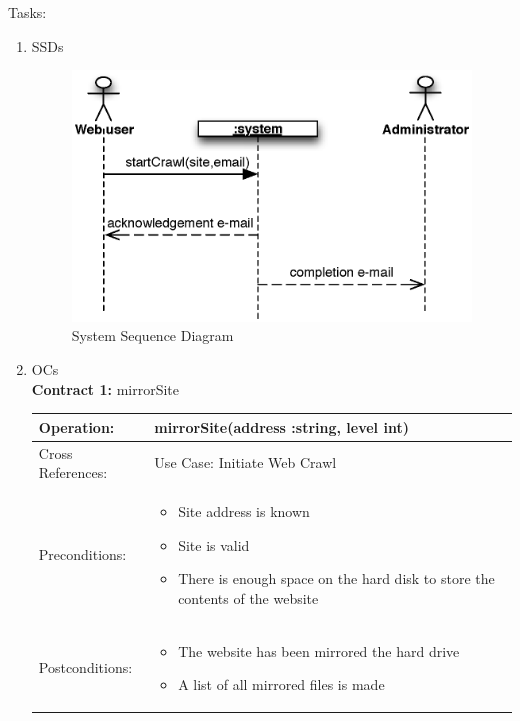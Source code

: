 \documentclass{article}
\begin{document}
\fancyhf{}
\rhead{\today}

{\large Tasks:}
\begin{enumerate}

\item SSDs 
\begin{figure}[H]
	\includegraphics[width=.8\textwidth]{SSD}
	\caption{System Sequence Diagram}
\end{figure}

\newpage

\item OCs\\

{\large \bf Contract 1:} mirrorSite \\[.5cm]
\begin{tabular}{|p{} | p{}|}
\hline
Operation: & mirrorSite(address :string, level int) \\ \hline
Cross References: & Use Case: Initiate Web Crawl\\ \hline
Preconditions: &
\begin{itemize}
	\item Site address is known
	\item Site is valid
	\item There is enough space on the hard disk to store the contents of the website
\end{itemize}\\ \hline

Postconditions: &
\begin{itemize}
	\item The website has been mirrored the hard drive
	\item A list of all mirrored files is made
\end{itemize}\\ \hline
\end{tabular} \\[1cm]


\end{enumerate}
\end{document}

